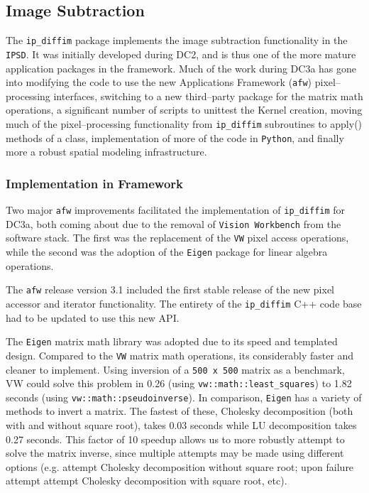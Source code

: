 
\subsection{Image Subtraction}

The {\tt ip\_diffim} package implements the image subtraction
functionality in the {\tt IPSD}.  It was initially developed during
DC2, and is thus one of the more mature application packages in the
framework.  Much of the work during DC3a has gone into modifying the
code to use the new Applications Framework ({\tt afw})
pixel--processing interfaces, switching to a new third--party package
for the matrix math operations, a significant number of scripts to
unittest the Kernel creation, moving much of the pixel--processing
functionality from {\tt ip\_diffim} subroutines to apply() methods of
a class, implementation of more of the code in {\tt Python}, and
finally more a robust spatial modeling infrastructure.

\subsubsection{Implementation in Framework}

Two major {\tt afw} improvements facilitated the implementation of
{\tt ip\_diffim} for DC3a, both coming about due to the removal of
{\tt Vision Workbench} from the software stack.  The first was the
replacement of the {\tt VW} pixel access operations, while the second
was the adoption of the {\tt Eigen} package for linear algebra
operations.  

The {\tt afw} release version 3.1 included the first stable release of
the new pixel accessor and iterator functionality.  The entirety of
the {\tt ip\_diffim} C++ code base had to be updated to use this new
API.

The {\tt Eigen} matrix math library was adopted due to its speed and
templated design.  Compared to the {\tt VW} matrix math operations,
its considerably faster and cleaner to implement.  Using inversion of
a {\tt 500 x 500} matrix as a benchmark, VW could solve this problem
in 0.26 (using {\tt vw::math::least\_squares}) to 1.82 seconds (using
{\tt vw::math::pseudoinverse}).  In comparison, {\tt Eigen} has a
variety of methods to invert a matrix.  The fastest of these, Cholesky
decomposition (both with and without square root), takes 0.03 seconds
while LU decomposition takes 0.27 seconds.  This factor of 10 speedup
allows us to more robustly attempt to solve the matrix inverse, since
multiple attempts may be made using different options (e.g. attempt
Cholesky decomposition without square root; upon failure attempt
attempt Cholesky decomposition with square root, etc).


